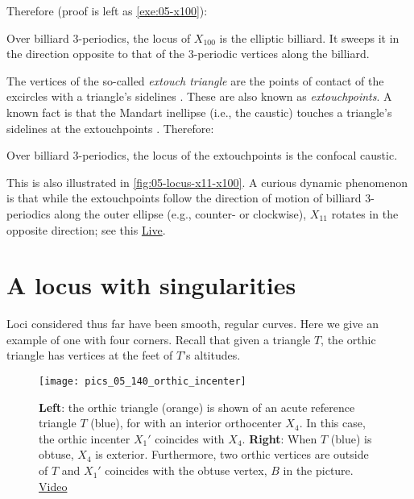 Therefore (proof is left as \cref{exe:05-x100}):

\begin{proposition}
Over billiard 3-periodics, the locus of $X_{100}$ is the elliptic billiard. It sweeps it in the direction opposite to that of the 3-periodic vertices along the billiard.
\label{prop:05-locus-x100}
\end{proposition}

The vertices of the so-called {\em extouch triangle} are the points of contact of the excircles with a triangle's sidelines \cite[Extouch triangle]{mw}. These are also known as {\em extouchpoints}. A known fact is that the Mandart inellipse (i.e., the caustic) touches a triangle's sidelines at the extouchpoints \cite[Mandart inellipse]{mw}. Therefore:

\begin{proposition}
Over billiard 3-periodics, the locus of the extouchpoints is the confocal caustic.
\end{proposition}

This is also illustrated in \cref{fig:05-locus-x11-x100}. A curious dynamic phenomenon is that while the extouchpoints follow the direction of motion of billiard 3-periodics along the outer ellipse (e.g., counter- or clockwise), $X_{11}$ rotates in the opposite direction; see this \href{https://bit.ly/2S2LVqp}{Live}.



\section{A locus with singularities}

Loci considered thus far have been smooth, regular curves. Here we give an example of one with four corners. Recall that given a triangle $T$, the orthic triangle has vertices at the feet of $T$'s altitudes.

\begin{figure}
    \centering
    \texttt{[image: pics\_05\_140\_orthic\_incenter]}
    \caption{\textbf{Left}: the orthic triangle (orange) is shown of an acute reference triangle $T$ (blue), for with an interior orthocenter $X_4$. In this case, the orthic incenter $X_1'$ coincides with $X_4$. \textbf{Right}: When $T$ (blue) is obtuse, $X_4$ is exterior. Furthermore, two orthic vertices are outside of $T$ and $X_1'$ coincides with the obtuse vertex, $B$ in the picture. \href{https://youtu.be/-bLuvICzmqM}{Video}}
    \label{fig:05-orthic-incenter}
\end{figure}

